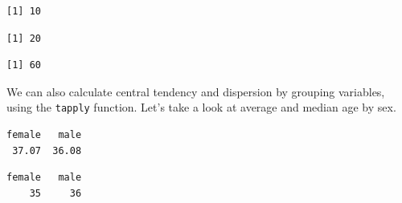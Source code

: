 \documentclass[]{book}
\newenvironment{Shaded}{\begin{snugshade}}{\end{snugshade}}
\newcommand{\CommentTok}[1]{\textcolor[rgb]{0.56,0.35,0.01}{\textit{#1}}}
\newcommand{\DataTypeTok}[1]{\textcolor[rgb]{0.13,0.29,0.53}{#1}}
\newcommand{\KeywordTok}[1]{\textcolor[rgb]{0.13,0.29,0.53}{\textbf{#1}}}
\newcommand{\NormalTok}[1]{#1}
\newcommand{\OperatorTok}[1]{\textcolor[rgb]{0.81,0.36,0.00}{\textbf{#1}}}
\newcommand{\OtherTok}[1]{\textcolor[rgb]{0.56,0.35,0.01}{#1}}
\begin{document}
\begin{verbatim}
[1] 10
\end{verbatim}

\begin{Shaded}
\end{Shaded}

\begin{verbatim}
[1] 20
\end{verbatim}

\begin{Shaded}
\end{Shaded}

\begin{verbatim}
[1] 60
\end{verbatim}

We can also calculate central tendency and dispersion by grouping variables, using the \texttt{tapply} function. Let's take a look at average and median age by sex.

\begin{Shaded}
\end{Shaded}

\begin{verbatim}
female   male 
 37.07  36.08 
\end{verbatim}

\begin{Shaded}
\end{Shaded}

\begin{verbatim}
female   male 
    35     36 
\end{verbatim}
\end{document}
